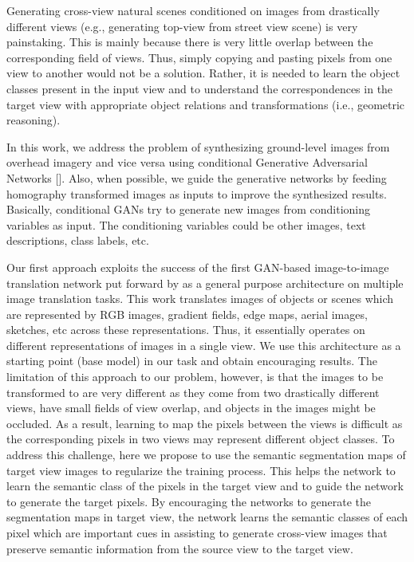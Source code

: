 \documentclass[times,twocolumn,final,authoryear]{elsarticle_modified}
\begin{document}
Generating cross-view natural scenes conditioned on images from drastically different views (e.g., generating top-view from street view scene) is very painstaking. This is mainly because there is very little overlap between the corresponding field of views. Thus, simply copying and pasting pixels from one view to another would not be a solution. Rather, it is needed to learn the object classes present in the input view and to understand the correspondences in the target view with appropriate object relations and transformations (i.e., geometric reasoning). 

In this work, we address the problem of synthesizing ground-level images from overhead imagery and vice versa using conditional Generative Adversarial Networks [\cite{DBLP:journals/corr/MirzaO14}]. Also, when possible, we guide the generative networks by feeding homography transformed images as inputs to improve the synthesized results. Basically, conditional GANs try to generate new images from conditioning variables as input. The conditioning variables could be other images, text descriptions, class labels, etc. 


Our first approach exploits the success of the first GAN-based image-to-image translation network put forward by \cite{pix2pix2017} as a general purpose architecture on multiple image translation tasks. 
This work translates images of objects or scenes which are represented by RGB images, gradient fields, edge maps, aerial images, sketches, etc across these representations. Thus, it essentially operates on different representations of images in a single view. 
We use this architecture as a starting point (base model) in our task and obtain encouraging results. 
The limitation of this approach to our problem, however, is that the images to be transformed to are very different as they come from two drastically different views, have small fields of view overlap, and objects in the images might be occluded. As a result, learning to map the pixels between the views is difficult as the corresponding pixels in two views may represent different object classes. 
To address this challenge, here we propose to use the semantic segmentation maps of target view images to regularize the training process. This helps the network to learn the semantic class of the pixels in the target view and to guide the network to generate the target pixels. By encouraging the networks to generate the segmentation maps in target view, the network learns the semantic classes of each pixel which are important cues in assisting to generate cross-view images that preserve semantic information from the source view to the target view.     
\end{document}
